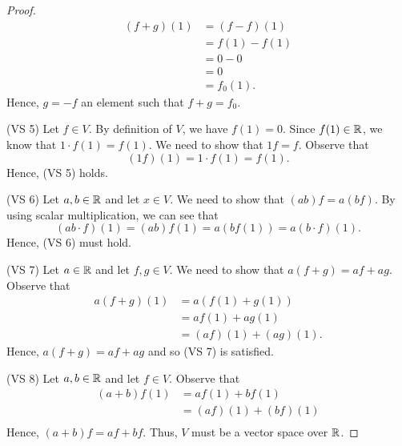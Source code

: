 \begin{proof}
    \begin{align*}
        (f+g)(1)  &= (f - f)(1)  \\
                  &= f(1) - f(1) \\
                  &= 0 - 0  \\
                  &= 0 \\
                  &= f_{0}(1).
    \end{align*}
    Hence, \( g = -f  \) an element such that \( f + g = f_{0} \).
\item[(VS 5)] Let \( f \in V  \). By definition of \( V  \), we have  \( f(1) = 0   \). Since \( f(1) \in \mathbb{R}  \), we know that \( 1 \cdot f(1) = f(1) \). We need to show that \( 1f = f  \). Observe that \[  (1f)(1) = 1 \cdot f(1) = f(1).  \]
    Hence, (VS 5) holds.
\item[(VS 6)] Let \( a,b \in \mathbb{R}  \) and let \( x \in V  \). We need to show that \( (ab)f = a(bf)  \). By using scalar multiplication, we can see that 
    \[  (ab \cdot f) (1) = (ab)f(1) = a (bf(1)) = a(b \cdot f)(1). \]
    Hence,  (VS 6) must hold.
\item[(VS 7)] Let \( a \in \mathbb{R}  \) and let \( f,g \in V  \). We need to show that \( a(f+g) = af + ag \). Observe that 
    \begin{align*}
        a(f+g)(1) &= a (f(1) + g(1))  \\
                  &= a f(1) + a g(1) \\
                  &=  (af)(1) + (ag)(1).
    \end{align*}
    Hence, \( a(f+g) = af + ag \) and so (VS 7) is satisfied.
\item[(VS 8)] Let \( a,b \in \mathbb{R}  \) and let \( f \in V  \). Observe that 
    \begin{align*}
        (a+b)f(1) &= a f(1) + b f(1)  \\
                  &=  (af)(1) + (bf)(1) \\
    \end{align*}
    Hence, \( (a+b)f =  af + bf  \). 
Thus, \( V  \) must be a vector space over \( \mathbb{R}  \).
\end{proof}

